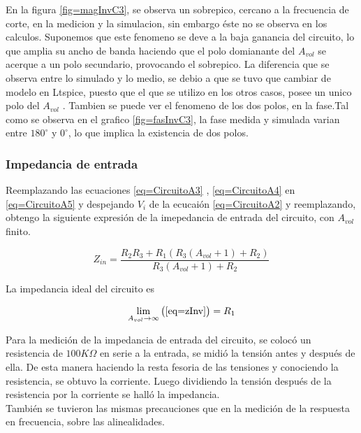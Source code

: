 \documentclass[../../main.tex]{subfiles}
\begin{document}
En la figura \ref{fig=magInvC3}, se observa un sobrepico, cercano a la frecuencia de corte, en la medicion y la simulacion, sin embargo éste no se observa en los calculos. Suponemos que este fenomeno se deve a la baja ganancia del circuito, lo que amplia su ancho de banda haciendo que el polo domianante del  
$A_{vol}$ se acerque a un polo secundario, provocando el sobrepico.
La diferencia que se observa entre lo simulado y lo medio, se debio a que se tuvo que cambiar de modelo en Ltspice, puesto que el que se utilizo en los otros casos, posee un unico polo del $A_{vol}$ .
Tambien se puede ver el fenomeno de los dos polos, en la fase.Tal como se observa en el grafico \ref{fig=fasInvC3}, la fase medida y simulada varian entre  $180^{\circ}$ y $0^{\circ}$, lo que implica la existencia de dos polos.

\subsubsection{Impedancia de entrada}

Reemplazando las ecuaciones \ref{eq=CircuitoA3} , \ref{eq=CircuitoA4} en \ref{eq=CircuitoA5} y despejando $V_{i}$ de la ecucaión \ref{eq=CircuitoA2} y reemplazando, obtengo la siguiente expresión de la imepedancia de entrada del circuito, con $A_{vol}$ finito.

\begin{equation}
Z_{in}=\frac{R_{2} R_{3}+ R_{1} (R_{3}(A_{vol} +1)+R_{2} )}{R_{3}(A_{vol}+1)+R_{2}}\label{eq=zInv}
\end{equation}

La impedancia ideal del circuito es

$$ \lim_{A_{vol}\to\infty} \big( \ref{eq=zInv} \big) =R_{1} $$

Para la medición de la impedancia de entrada del circuito, se colocó un resistencia de $100K \Omega$ en serie a la entrada, se midió la tensión antes y después de ella. De esta manera haciendo la resta fesoria de las tensiones y conociendo la resistencia, se obtuvo la corriente. Luego dividiendo la tensión después de la resistencia por la corriente se halló la impedancia.
\\
También se tuvieron las mismas precauciones que en la medición de la respuesta en frecuencia, sobre las alinealidades.
\end{document}
